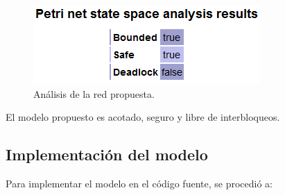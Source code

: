 \documentclass[a4paper]{book}
\begin{document}
\begin{figure} [H]
	\begin{center}
        \includegraphics[scale=0.7]{./imagenes/it1validacion.png}
		\caption{An\'alisis de la red propuesta.}
		\label{Fig:validacion1}
	\end{center}
\end{figure}

El modelo propuesto es acotado, seguro y libre de interbloqueos.

\subsection{Implementaci\'on del modelo}
Para implementar el modelo en el c\'odigo fuente, se procedi\'o a:
\end{document}
